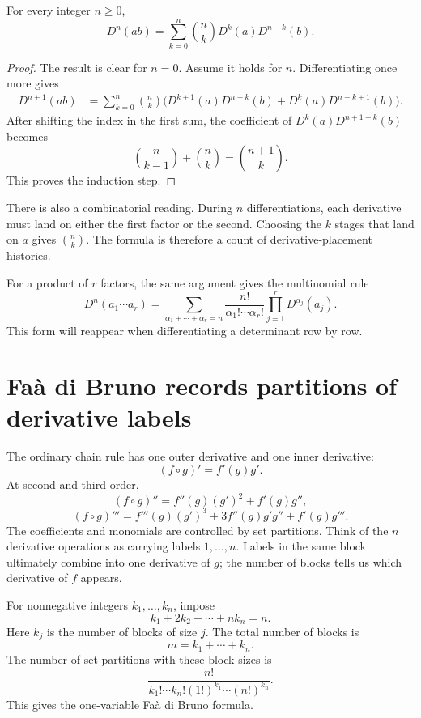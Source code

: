 \begin{theorem}
For every integer \(n\geq 0\),
\[
  D^n(ab)
  =\sum_{k=0}^{n}\binom{n}{k}D^k(a)D^{n-k}(b).
\]
\end{theorem}

\begin{proof}
The result is clear for \(n=0\).  Assume it holds for \(n\).  Differentiating once more gives
\[
\begin{aligned}
D^{n+1}(ab)
&=\sum_{k=0}^{n}\binom{n}{k}
 \bigl(D^{k+1}(a)D^{n-k}(b)+D^k(a)D^{n-k+1}(b)\bigr).
\end{aligned}
\]
After shifting the index in the first sum, the coefficient of
\(D^k(a)D^{n+1-k}(b)\) becomes
\[
  \binom{n}{k-1}+\binom{n}{k}=\binom{n+1}{k}.
\]
This proves the induction step.
\end{proof}

There is also a combinatorial reading.  During \(n\) differentiations, each derivative must land on either the first factor or the second.  Choosing the \(k\) stages that land on \(a\) gives \(\binom{n}{k}\).  The formula is therefore a count of derivative-placement histories.

For a product of \(r\) factors, the same argument gives the multinomial rule
\[
  D^n(a_1\cdots a_r)
  =\sum_{\alpha_1+\cdots+\alpha_r=n}
   \frac{n!}{\alpha_1!\cdots\alpha_r!}
   \prod_{j=1}^{r}D^{\alpha_j}(a_j).
\]
This form will reappear when differentiating a determinant row by row.

\section{Faà di Bruno records partitions of derivative labels}

The ordinary chain rule has one outer derivative and one inner derivative:
\[
  (f\circ g)'=f'(g)g'.
\]
At second and third order,
\[
  (f\circ g)''=f''(g)(g')^2+f'(g)g'',
\]
\[
  (f\circ g)'''
  =f'''(g)(g')^3+3f''(g)g'g''+f'(g)g'''.
\]
The coefficients and monomials are controlled by set partitions.  Think of the \(n\) derivative operations as carrying labels \(1,\ldots,n\).  Labels in the same block ultimately combine into one derivative of \(g\); the number of blocks tells us which derivative of \(f\) appears.

For nonnegative integers \(k_1,\ldots,k_n\), impose
\[
  k_1+2k_2+\cdots+nk_n=n.
\]
Here \(k_j\) is the number of blocks of size \(j\).  The total number of blocks is
\[
  m=k_1+\cdots+k_n.
\]
The number of set partitions with these block sizes is
\[
  \frac{n!}{k_1!\cdots k_n!(1!)^{k_1}\cdots(n!)^{k_n}}.
\]
This gives the one-variable Faà di Bruno formula.

